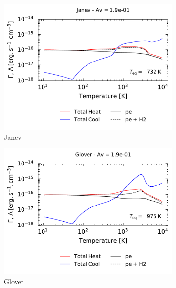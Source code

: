\begin{figure}[!h]
    \centering
    \begin{subfigure}[t]{0.49\textwidth} %
        \centering \includegraphics[trim = {0 0 0 1cm },clip,width=1\textwidth]{figure/H2/bosse_dcte_janevVSglover/janev/GC_h_1p9em01.pdf}
        \caption{Janev}
    \end{subfigure}
    \begin{subfigure}[t]{0.49\textwidth}
        \centering \includegraphics[trim = {0 0 0 1cm },clip,width=1\textwidth]{figure/H2/bosse_dcte_janevVSglover/glover/GC_h_1p9em01.pdf}
        \caption{Glover}
    \end{subfigure}
    ~
    \begin{subfigure}[t]{0.49\textwidth} %

\end{subfigure}
\end{figure}

